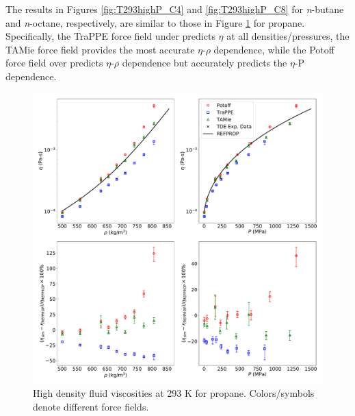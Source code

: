 \documentclass[preprint,review,12pt]{elsarticle}
\begin{document}
The results in Figures \ref{fig:T293highP_C4} and \ref{fig:T293highP_C8} for \textit{n}-butane and \textit{n}-octane, respectively, are similar to those in Figure \ref{fig:T293highP_C3} for propane. Specifically, the TraPPE force field under predicts $\eta$ at all densities/pressures, the TAMie force field provides the most accurate $\eta$-$\rho$ dependence, while the Potoff force field over predicts $\eta$-$\rho$ dependence but accurately predicts the $\eta$-P dependence.  

\begin{figure}[p!]
	\centering
	\includegraphics[width=6.4in]{compare_REFPROP_T293highP_C3H8_Pas.pdf}
	\caption{High density fluid viscosities at 293 K for propane. Colors/symbols denote different force fields.}
	\label{fig:T293highP_C3}
\end{figure} 
\end{document}
